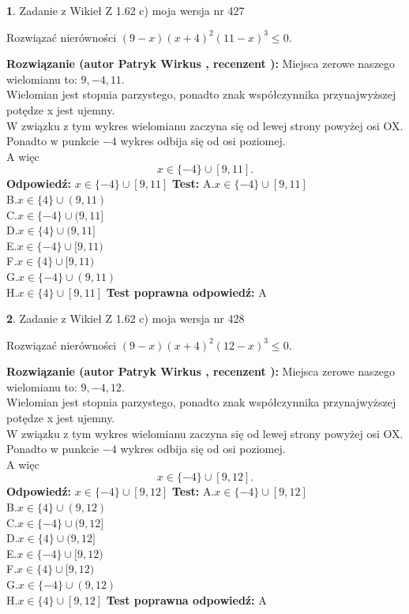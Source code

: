 \documentclass[12pt, a4paper]{article}
\theoremstyle{definition} %
\newtheorem{zad}{}
\newcommand{\zadStart}[1]{\begin{zad}#1\newline}
\newcommand{\zadStop}{\end{zad}}
\newcommand{\rozwStart}[2]{\noindent \textbf{Rozwiązanie (autor #1 , recenzent #2): }\newline}
\newcommand{\rozwStop}{\newline}
\newcommand{\odpStart}{\noindent \textbf{Odpowiedź:}\newline}
\newcommand{\odpStop}{\newline}
\newcommand{\testStart}{\noindent \textbf{Test:}\newline}
\newcommand{\testStop}{\newline}
\newcommand{\kluczStart}{\noindent \textbf{Test poprawna odpowiedź:}\newline}
\newcommand{\kluczStop}{\newline}
\begin{document}
\zadStart{Zadanie z Wikieł Z 1.62 c) moja wersja nr 427}

Rozwiązać nierówności $(9-x)(x+4)^{2}(11-x)^{3}\le0$.
\zadStop
\rozwStart{Patryk Wirkus}{}
Miejsca zerowe naszego wielomianu to: $9, -4, 11$.\\
Wielomian jest stopnia parzystego, ponadto znak współczynnika przy\linebreak najwyższej potędze x jest ujemny.\\ W związku z tym wykres wielomianu zaczyna się od lewej strony powyżej osi OX.\\
Ponadto w punkcie $-4$ wykres odbija się od osi poziomej.\\
A więc $$x \in \{-4\} \cup [9,11].$$
\rozwStop
\odpStart
$x \in \{-4\} \cup [9,11]$
\odpStop
\testStart
A.$x \in \{-4\} \cup [9,11]$\\
B.$x \in \{4\} \cup (9,11)$\\
C.$x \in \{-4\} \cup (9,11]$\\
D.$x \in \{4\} \cup (9,11]$\\
E.$x \in \{-4\} \cup [9,11)$\\
F.$x \in \{4\} \cup [9,11)$\\
G.$x \in \{-4\} \cup (9,11)$\\
H.$x \in \{4\} \cup [9,11]$
\testStop
\kluczStart
A
\kluczStop



\zadStart{Zadanie z Wikieł Z 1.62 c) moja wersja nr 428}

Rozwiązać nierówności $(9-x)(x+4)^{2}(12-x)^{3}\le0$.
\zadStop
\rozwStart{Patryk Wirkus}{}
Miejsca zerowe naszego wielomianu to: $9, -4, 12$.\\
Wielomian jest stopnia parzystego, ponadto znak współczynnika przy\linebreak najwyższej potędze x jest ujemny.\\ W związku z tym wykres wielomianu zaczyna się od lewej strony powyżej osi OX.\\
Ponadto w punkcie $-4$ wykres odbija się od osi poziomej.\\
A więc $$x \in \{-4\} \cup [9,12].$$
\rozwStop
\odpStart
$x \in \{-4\} \cup [9,12]$
\odpStop
\testStart
A.$x \in \{-4\} \cup [9,12]$\\
B.$x \in \{4\} \cup (9,12)$\\
C.$x \in \{-4\} \cup (9,12]$\\
D.$x \in \{4\} \cup (9,12]$\\
E.$x \in \{-4\} \cup [9,12)$\\
F.$x \in \{4\} \cup [9,12)$\\
G.$x \in \{-4\} \cup (9,12)$\\
H.$x \in \{4\} \cup [9,12]$
\testStop
\kluczStart
A
\kluczStop
\end{document}
